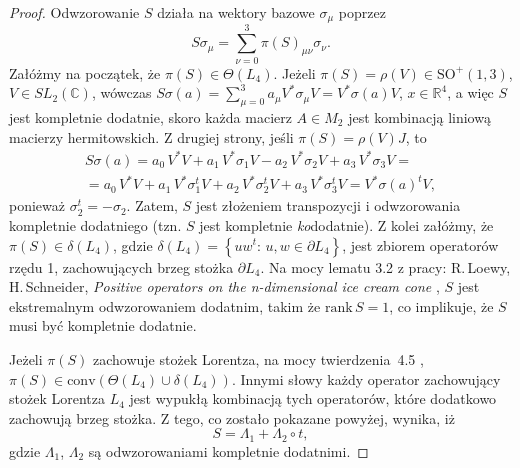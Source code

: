 \begin{proof}
\label{RandomLabel:875919}
  Odwzorowanie $S$ działa na wektory bazowe $\sigma_{\mu}$ poprzez
\begin{equation}
 S \sigma_{\mu} = \sum_{\nu = 0}^{3} \pi(S)_{\mu \nu} \sigma_{\nu}.
\end{equation}
Załóżmy na początek, że $\pi(S) \in \Theta(L_{4})$.
Jeżeli $\pi(S) = \rho(V) \in \text{SO}^{+}(1,3)$,
$V \in SL_{2}(\mathbb{C})$,
wówczas
$S \sigma(a) = \sum_{\mu = 0}^{3}  a_{\mu} V^{*} \sigma_{\mu} V =
 V^{*} \sigma(a) V$,
 $x \in \mathbb{R}^{4}$,
a więc $S$ jest kompletnie dodatnie,
skoro każda macierz $A \in M_{2}$ jest kombinacją liniową macierzy hermitowskich.
Z drugiej strony,
jeśli $\pi(S) = \rho(V) J$,
to
\begin{multline}
\label{RandomLabel:830200}
S \sigma(a) =
  a_{0} \, V^{*}V + a_{1} \, V^{*} \sigma_{1} V -
  a_{2} \, V^{*} \sigma_{2} V +
  a_{3} \, V^{*} \sigma_{3} V = \\
  = a_{0} \, V^{*}V + a_{1} \, V^{*} \sigma_{1}^{t} V +
  a_{2} \, V^{*} \sigma_{2}^{t} V +
  a_{3} \, V^{*} \sigma_{3}^{t} V =
  V^{*} \sigma(a)^{t} V,
\end{multline}
ponieważ $\sigma_{2}^{t} = - \sigma_{2}$.
Zatem, $S$ jest złożeniem transpozycji i odwzorowania kompletnie dodatniego
(tzn. $S$  jest kompletnie \emph{ko}dodatnie).
Z kolei załóżmy, że $\pi(S) \in \delta(L_{4})$,
gdzie
$
 \delta(L_{4}) = \left \{ u w^{t}:
 \, u, w \in \partial L_{4}  \right \}
$,
jest zbiorem operatorów rzędu 1, zachowujących brzeg stożka $\partial L_{4}$.
Na mocy  lematu 3.2 z pracy:
R.\,Loewy, H.\,Schneider,
\emph{Positive operators on the n-dimensional ice cream cone}
\cite{loewy1975positive},
$S$ jest ekstremalnym odwzorowaniem dodatnim, takim że $\text{rank}\,S = 1$,
co implikuje, że $S$ musi być kompletnie dodatnie.

Jeżeli $\pi(S)$ zachowuje stożek Lorentza,
na mocy \mbox{twierdzenia 4.5} \cite{loewy1975positive},
$\pi(S) \in \text{conv} \left ( \Theta(L_{4}) \cup \delta(L_{4}) \right)$.
Innymi słowy każdy operator zachowujący stożek Lorentza $L_{4}$
jest wypukłą kombinacją tych operatorów, które dodatkowo zachowują brzeg stożka.
Z tego, co zostało pokazane powyżej, wynika, iż
\begin{equation}
\label{RandomLabel:587827}
    S = \Lambda_{1} + \Lambda_{2} \circ t,
\end{equation}
gdzie $\Lambda_{1}$, $\Lambda_{2}$
są odwzorowaniami kompletnie dodatnimi.
\end{proof}

